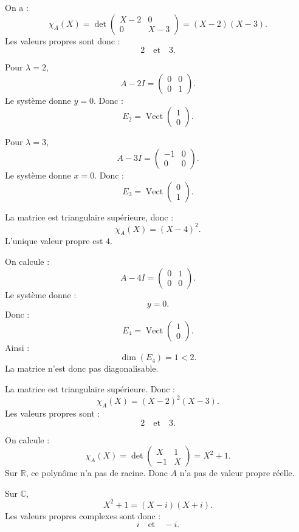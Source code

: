 \documentclass[11pt,a4paper]{article}
\newcommand{\R}{\mathbb R}
\newcommand{\C}{\mathbb C}
\newcommand{\Vect}{\operatorname{Vect}}
\begin{document}
\begin{correctionbox}[1]
On a :
\[
\chi_A(X)=\det
\begin{pmatrix}
X-2&0\\
0&X-3
\end{pmatrix}
=(X-2)(X-3).
\]
Les valeurs propres sont donc :
\[
2\quad\text{et}\quad3.
\]

Pour \(\lambda=2\),
\[
A-2I=
\begin{pmatrix}
0&0\\
0&1
\end{pmatrix}.
\]
Le système donne \(y=0\). Donc :
\[
E_2=\Vect
\begin{pmatrix}
1\\0
\end{pmatrix}.
\]

Pour \(\lambda=3\),
\[
A-3I=
\begin{pmatrix}
-1&0\\
0&0
\end{pmatrix}.
\]
Le système donne \(x=0\). Donc :
\[
E_3=\Vect
\begin{pmatrix}
0\\1
\end{pmatrix}.
\]
\end{correctionbox}

\begin{correctionbox}[2]
La matrice est triangulaire supérieure, donc :
\[
\chi_A(X)=(X-4)^2.
\]
L'unique valeur propre est \(4\).

On calcule :
\[
A-4I=
\begin{pmatrix}
0&1\\
0&0
\end{pmatrix}.
\]
Le système donne :
\[
y=0.
\]
Donc :
\[
E_4=\Vect
\begin{pmatrix}
1\\0
\end{pmatrix}.
\]
Ainsi :
\[
\dim(E_4)=1<2.
\]
La matrice n'est donc pas diagonalisable.
\end{correctionbox}

\begin{correctionbox}[3]
La matrice est triangulaire supérieure. Donc :
\[
\chi_A(X)=(X-2)^2(X-3).
\]
Les valeurs propres sont :
\[
2\quad\text{et}\quad3.
\]
\end{correctionbox}

\begin{correctionbox}[4]
On calcule :
\[
\chi_A(X)=\det
\begin{pmatrix}
X&1\\
-1&X
\end{pmatrix}
=X^2+1.
\]
Sur \(\R\), ce polynôme n'a pas de racine.  
Donc \(A\) n'a pas de valeur propre réelle.

Sur \(\C\),
\[
X^2+1=(X-i)(X+i).
\]
Les valeurs propres complexes sont donc :
\[
i\quad\text{et}\quad -i.
\]
\end{correctionbox}
\end{document}

